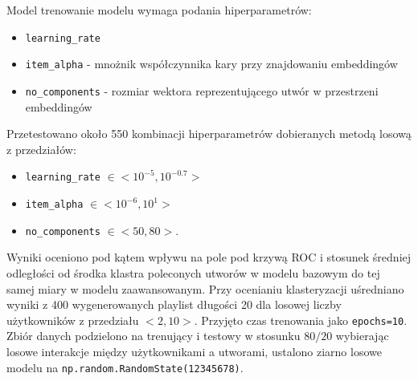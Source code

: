 \documentclass[10pt,a4paper]{article}
\begin{document}
Model trenowanie modelu wymaga podania hiperparametrów:
\begin{itemize}
    \item \texttt{learning\_rate}
    \item \texttt{item\_alpha} - mnożnik współczynnika kary przy znajdowaniu embeddingów
    \item \texttt{no\_components} - rozmiar wektora reprezentującego utwór w przestrzeni embeddingów
\end{itemize}

Przetestowano około 550 kombinacji hiperparametrów dobieranych metodą losową z przedziałów:
\begin{itemize}
    \item \texttt{learning\_rate} $\in <10^{-5}, 10^{-0.7}>$
    \item \texttt{item\_alpha} $\in <10^{-6}, 10^{1}>$
    \item \texttt{no\_components} $\in <50, 80>$.
\end{itemize}

Wyniki oceniono pod kątem wpływu na pole pod krzywą ROC i stosunek średniej odległości od środka klastra poleconych utworów w modelu bazowym do tej samej miary w modelu zaawansowanym. Przy ocenianiu klasteryzacji uśredniano wyniki z 400 wygenerowanych playlist długości 20 dla losowej liczby użytkowników z przedziału $<2, 10>$. Przyjęto czas trenowania jako \texttt{epochs=10}. Zbiór danych podzielono na trenujący i testowy w stosunku $80/20$ wybierając losowe interakcje między użytkownikami a utworami, ustalono ziarno losowe modelu na \texttt{np.random.RandomState(12345678)}.
\end{document}

